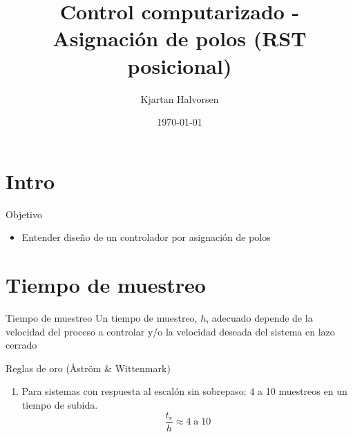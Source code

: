 \documentclass[presentation,aspectratio=169]{beamer}
\author{Kjartan Halvorsen}
\date{\today}
\title{Control computarizado - Asignación de polos (RST posicional)}
\begin{document}
\maketitle

\section{Intro}
\label{sec:orgb33e3eb}

\begin{frame}[label={sec:orgceaa17c}]{Objetivo}
\begin{itemize}
\item Entender diseño de un controlador por asignación de polos
\end{itemize}
\end{frame}

\section{Tiempo de muestreo}
\label{sec:orgc7cc4f8}
\begin{frame}[label={sec:org38816f2}]{Tiempo de muestreo}
\alert{Un tiempo de muestreo, \(h\), adecuado depende de la velocidad del proceso a controlar y/o la velocidad deseada del sistema en lazo cerrado}  
\begin{block}{Reglas de oro (Åström \& Wittenmark)}
\begin{enumerate}
\item Para sistemas con respuesta al escalón \alert{sin} sobrepaso: \alert{4 a 10} muestreos en un tiempo de subida. \[ \frac{t_r}{h} \approx 4 \; \text{a} \; 10 \]
\begin{center}
\def\TT{1}
\pgfmathsetmacro{\hh}{\TT/6}
\end{center}
\end{enumerate}
\end{block}
\end{frame}
\end{document}

